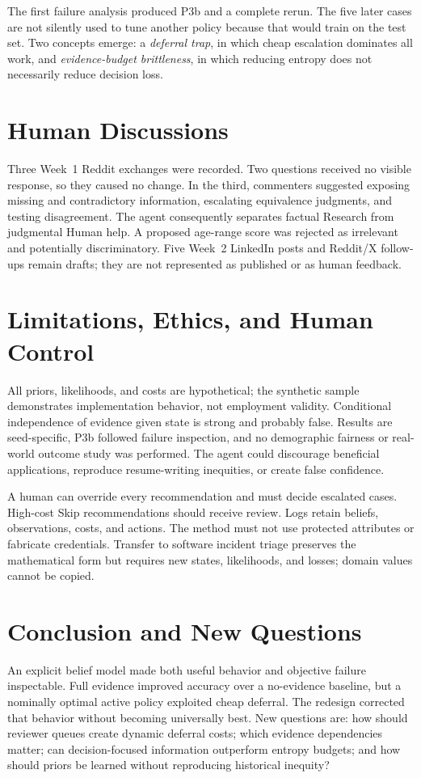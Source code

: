 \documentclass{article}
\begin{document}
The first failure analysis produced P3b and a complete rerun. The five later cases are not silently used to tune another policy because that would train on the test set. Two concepts emerge: a \emph{deferral trap}, in which cheap escalation dominates all work, and \emph{evidence-budget brittleness}, in which reducing entropy does not necessarily reduce decision loss.

\section{Human Discussions}
Three Week~1 Reddit exchanges were recorded. Two questions received no visible response, so they caused no change. In the third, commenters suggested exposing missing and contradictory information, escalating equivalence judgments, and testing disagreement. The agent consequently separates factual Research from judgmental Human help. A proposed age-range score was rejected as irrelevant and potentially discriminatory. Five Week~2 LinkedIn posts and Reddit/X follow-ups remain drafts; they are not represented as published or as human feedback.

\section{Limitations, Ethics, and Human Control}
All priors, likelihoods, and costs are hypothetical; the synthetic sample demonstrates implementation behavior, not employment validity. Conditional independence of evidence given state is strong and probably false. Results are seed-specific, P3b followed failure inspection, and no demographic fairness or real-world outcome study was performed. The agent could discourage beneficial applications, reproduce resume-writing inequities, or create false confidence.

A human can override every recommendation and must decide escalated cases. High-cost Skip recommendations should receive review. Logs retain beliefs, observations, costs, and actions. The method must not use protected attributes or fabricate credentials. Transfer to software incident triage preserves the mathematical form but requires new states, likelihoods, and losses; domain values cannot be copied.

\section{Conclusion and New Questions}
An explicit belief model made both useful behavior and objective failure inspectable. Full evidence improved accuracy over a no-evidence baseline, but a nominally optimal active policy exploited cheap deferral. The redesign corrected that behavior without becoming universally best. New questions are: how should reviewer queues create dynamic deferral costs; which evidence dependencies matter; can decision-focused information outperform entropy budgets; and how should priors be learned without reproducing historical inequity?
\end{document}

